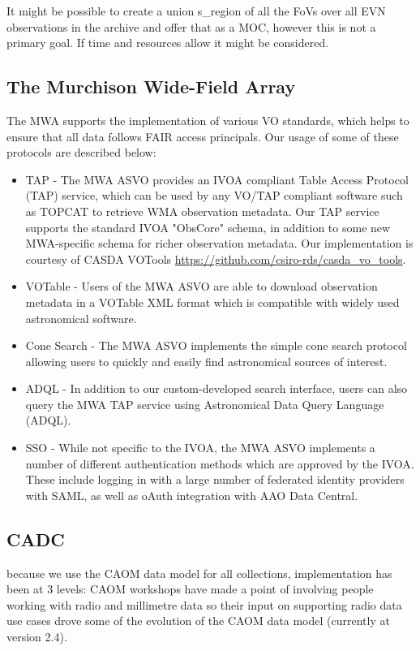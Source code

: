 \documentclass[11pt,a4paper]{ivoa}
\begin{document}
It might be possible to create a union s\_region of all the FoVs over all EVN observations in the 
archive and offer that as a MOC, however this is not a primary goal. If time and resources allow it 
might be considered.

\subsection{The Murchison Wide-Field Array}
\label{sec:MWA}
The MWA supports the implementation of various VO standards, which helps to ensure that all data follows 
FAIR access principals. Our usage of some of these protocols are described below:
\begin{itemize}
\item TAP - The MWA ASVO provides an IVOA compliant Table Access Protocol (TAP) service, which can be 
used by any VO/TAP compliant software such as TOPCAT to retrieve WMA observation metadata. Our TAP 
service supports the standard IVOA "ObsCore" schema, in addition to some new MWA-specific schema for 
richer observation metadata. Our implementation is courtesy of CASDA VOTools 
\url{https://github.com/csiro-rds/casda_vo_tools}.
\item VOTable - Users of the MWA ASVO are able to download observation metadata in a VOTable XML format 
which is compatible with widely used astronomical software.
\item Cone Search - The MWA ASVO implements the simple cone search protocol allowing users to quickly
and easily find astronomical sources of interest.
\item ADQL - In addition to our custom-developed search interface, users can also query the MWA TAP
service using Astronomical Data Query Language (ADQL).
\item SSO - While not specific to the IVOA, the MWA ASVO implements a number of different authentication 
methods which are approved by the IVOA. These include logging in with a large number of federated 
identity providers with SAML, as well as oAuth integration with AAO Data Central.
\end{itemize}

\subsection{CADC}
\label{sec:CADC}
because we use the CAOM data model for all collections, implementation has been at 3 levels:
CAOM workshops have made a point of involving people working with radio and millimetre data so their 
input on supporting radio data use cases drove some of the evolution of the CAOM data model (currently 
at version 2.4).
\end{document}
